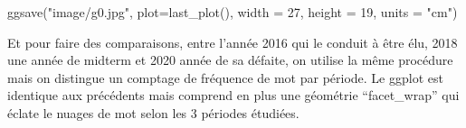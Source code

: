 \documentclass[
  letterpaper,
  DIV=11,
  numbers=noendperiod]{scrreprt}
\newenvironment{Shaded}{\begin{snugshade}}{\end{snugshade}}
\newcommand{\AttributeTok}[1]{\textcolor[rgb]{0.40,0.45,0.13}{#1}}
\newcommand{\DecValTok}[1]{\textcolor[rgb]{0.68,0.00,0.00}{#1}}
\newcommand{\FunctionTok}[1]{\textcolor[rgb]{0.28,0.35,0.67}{#1}}
\newcommand{\NormalTok}[1]{\textcolor[rgb]{0.00,0.23,0.31}{#1}}
\newcommand{\StringTok}[1]{\textcolor[rgb]{0.13,0.47,0.30}{#1}}
\begin{document}
\begin{Shaded}
\begin{Highlighting}[]
\FunctionTok{ggsave}\NormalTok{(}\StringTok{"image/g0.jpg"}\NormalTok{, }\AttributeTok{plot=}\FunctionTok{last\_plot}\NormalTok{(), }\AttributeTok{width =} \DecValTok{27}\NormalTok{, }\AttributeTok{height =} \DecValTok{19}\NormalTok{, }\AttributeTok{units =} \StringTok{"cm"}\NormalTok{)}
\end{Highlighting}
\end{Shaded}

Et pour faire des comparaisons, entre l'année 2016 qui le conduit à être
élu, 2018 une année de midterm et 2020 année de sa défaite, on utilise
la même procédure mais on distingue un comptage de fréquence de mot par
période. Le ggplot est identique aux précédents mais comprend en plus
une géométrie ``facet\_wrap'' qui éclate le nuages de mot selon les 3
périodes étudiées.
\end{document}
